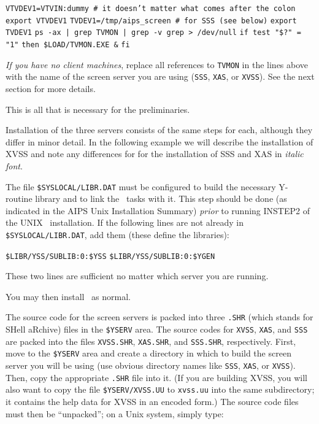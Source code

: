 \noindent
{\tt VTVDEV1=VTVIN:dummy \qquad\qquad \# it doesn't matter what
comes after the colon}\hfill \break
{\tt export VTVDEV1}\hfill\break
{\tt TVDEV1=/tmp/aips\_screen \qquad\qquad \# for SSS (see
below)}\hfill\break
{\tt export TVDEV1}\hfill\break
{\tt ps -ax | grep TVMON | grep -v grep > /dev/null} \hfill\break
{\tt if test "\$?" = "1"}\hfill\break
{\tt then \$LOAD/TVMON.EXE \&}\hfill\break
{\tt fi}

\noindent
{\it If you have no client machines}, replace all references to
{\tt TVMON} in the lines above with the name of the screen server you
are using ({\tt SSS}, {\tt XAS}, or \hbox{{\tt XVSS}}).  See the next
section for more details.

This is all that is necessary for the preliminaries.


Installation of the three servers consists of the same steps for each,
although they differ in minor detail.  In the following example we will
describe the installation of XVSS and note any differences for for the
installation of SSS and XAS in {\it italic font}.


The file {\tt \$SYSLOCAL/LIBR.DAT} must be configured to build the
necessary Y-routine library and to link the \AIPS\ tasks with it.
This step should be done (as indicated in the AIPS Unix Installation
Summary) {\it prior} to running INSTEP2 of the UNIX \AIPS\ installation.
If the following lines are not already in {\tt \$SYSLOCAL/LIBR.DAT},
add them (these define the libraries):

\noindent
{\tt \$LIBR/YSS/SUBLIB:0:\$YSS}\hfill\break
{\tt \$LIBR/YSS/SUBLIB:0:\$YGEN}

\noindent
These two lines are sufficient no matter which server you are running.

You may then install \AIPS\ as normal.


The source code for the screen servers is packed into three {\tt .SHR}
(which stands for SHell aRchive) files in the {\tt \$YSERV} area.  The
source codes for {\tt XVSS}, {\tt XAS}, and {\tt SSS} are packed into
the files {\tt XVSS.SHR}, {\tt XAS.SHR}, and {\tt SSS.SHR}, respectively.
First, move to the {\tt \$YSERV} area and create a directory in which to
build the screen server you will be using (use obvious directory names
like {\tt SSS}, {\tt XAS}, or \hbox{{\tt XVSS}}).  Then, copy the
appropriate {\tt .SHR} file into it.  (If you are building XVSS, you
will also want to copy the file {\tt \$YSERV/XVSS.UU} to {\tt xvss.uu}
into the same subdirectory; it contains the help data for XVSS in an
encoded form.)  The source code files must then be ``unpacked''; on a
Unix system, simply type:

